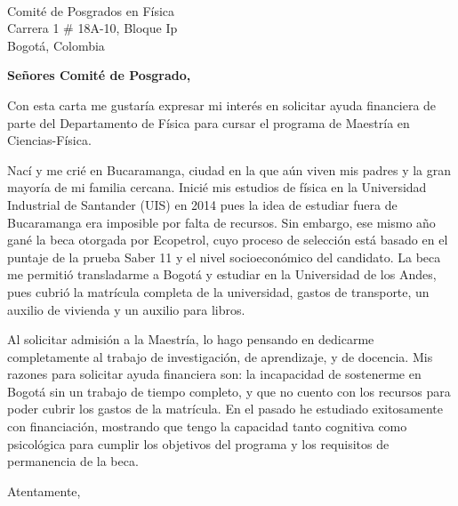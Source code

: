 \documentclass[10pt]{letter} %
\begin{document}

\begin{letter}{\\ Comité de Posgrados en Física \\ Carrera 1 \# 18A-10, Bloque Ip \\ Bogotá, Colombia} %


\opening{\textbf{Señores Comité de Posgrado,}}
Con esta carta me gustaría expresar mi interés en solicitar ayuda financiera de parte del Departamento de Física para cursar el programa de Maestría en Ciencias-Física.


Nací y me crié en Bucaramanga, ciudad en la que aún viven mis padres y la gran mayoría de mi familia cercana.  Inicié mis estudios de física en la Universidad Industrial de Santander (UIS) en 2014 pues la idea de estudiar fuera de Bucaramanga era imposible por falta de recursos. Sin embargo, ese mismo año gané la beca  otorgada por Ecopetrol, cuyo proceso de selección está basado en el puntaje de la prueba Saber 11 y el nivel socioeconómico del candidato. La beca me permitió transladarme a Bogotá y estudiar en la Universidad de los Andes, pues cubrió la matrícula completa de la universidad, gastos de transporte, un auxilio de vivienda y un auxilio para libros.


Al solicitar admisión a la Maestría, lo hago pensando en dedicarme completamente al trabajo de  investigación, de aprendizaje, y de docencia. Mis razones para solicitar ayuda financiera son: la incapacidad de sostenerme en Bogotá sin un trabajo de tiempo completo, y que no cuento con los recursos para poder cubrir los gastos de la matrícula. En el pasado he estudiado exitosamente con financiación, mostrando que tengo la capacidad tanto cognitiva como psicológica para cumplir los objetivos del programa y los requisitos de permanencia de la beca.


\vspace{2\parskip} %
\closing{Atentamente,}
\vspace{2\parskip} %



\end{letter}
 
\end{document}
